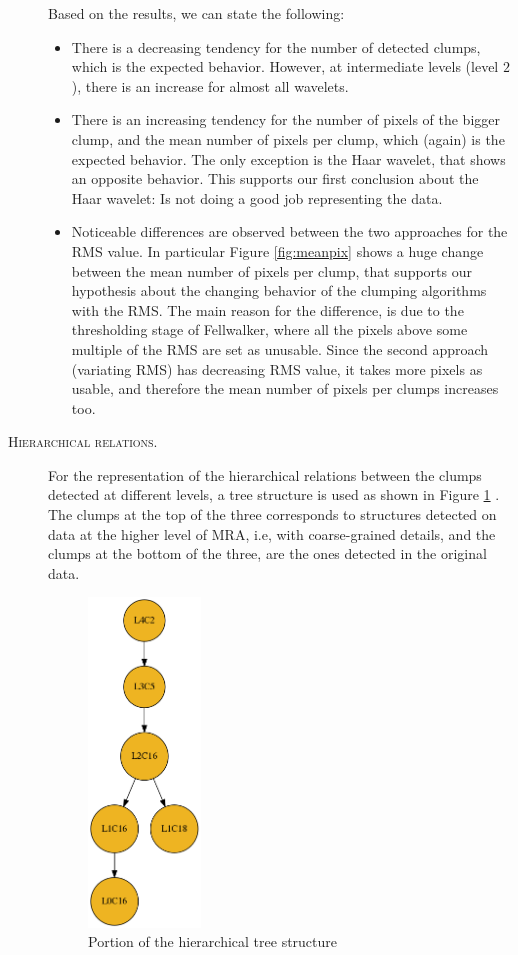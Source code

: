 \documentclass[letter, 11pt]{article}
\begin{document}
\begin{description}
    Based on the results, we can state the following:
    \begin{itemize}
        \item There is a decreasing tendency for the number of detected clumps, which is the expected behavior. However, at intermediate levels (level $2$), there is an increase for almost all wavelets.
        \item There is an increasing tendency for the number of pixels of the bigger clump, and the mean number of pixels per clump, which (again) is the expected behavior. The only exception is the Haar wavelet, that shows an opposite behavior. This supports our first conclusion about the Haar wavelet: Is not doing a good job representing the data.
        \item Noticeable differences are observed between the two approaches for the RMS value. In particular Figure \ref{fig:meanpix} shows a huge change between the mean number of pixels per clump, that supports our hypothesis about the changing behavior of the clumping algorithms with the RMS. The main reason for the difference, is due to the thresholding stage of Fellwalker, where all the pixels above some multiple of the RMS are set as unusable. Since the second approach (variating RMS) has decreasing RMS value, it takes more pixels as usable, and therefore the mean number of pixels per clumps increases too.  
    \end{itemize}



    \item[\textsc{Hierarchical relations.}] For the representation of the hierarchical relations between the clumps detected at different levels, a tree structure is used as shown in Figure \ref{fig:htree} \footnotemark[1]. The clumps at the top of the three corresponds to structures detected on data at the higher level of MRA, i.e, with coarse-grained details, and the clumps at the bottom of the three, are the ones detected in the original data. 

    \begin{figure}[htpb!]
    \centering
    \includegraphics[width=3cm]{sub_htree}
    \caption{Portion of the hierarchical tree structure}
    \label{fig:htree}
    \end{figure}


\end{description}
\end{document}
